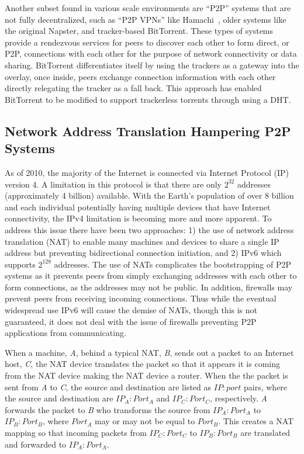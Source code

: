 \documentclass[conference]{IEEEtran}
\begin{document}
Another subset found in various scale environments are ``P2P'' systems that are
not fully decentralized, such as ``P2P VPNs'' like Hamachi~\cite{hamachi},
older systems like the original Napster, and tracker-based BitTorrent.  These
types of systems provide a rendezvous services for peers to discover each other
to form direct, or P2P, connections with each other for the purpose of network
connectivity or data sharing.  BitTorrent differentiates itself by using the
trackers as a gateway into the overlay, once inside, peers exchange connection
information with each other directly relegating the tracker as a fall back.
This approach has enabled BitTorrent to be modified to support trackerless
torrents through using a DHT.

\subsection{Network Address Translation Hampering P2P Systems}

As of 2010, the majority of the Internet is connected via Internet Protocol
(IP) version 4.  A limitation in this protocol is that there are only $2^{32}$
addresses (approximately 4 billion) available.  With the Earth's population of
over 8 billion and each individual potentially having multiple devices that
have Internet connectivity, the IPv4 limitation is becoming more and more
apparent.  To address this issue there have been two approaches:  1) the use of
network address translation (NAT) to enable many machines and devices to share
a single IP address but preventing bidirectional connection initiation, and 2)
IPv6 which supports $2^{128}$ addresses.  The use of NATs complicates the
bootstrapping of P2P systems as it prevents peers from simply exchanging
addresses with each other to form connections, as the addresses may not be
public.  In addition, firewalls may prevent peers from receiving incoming
connections.  Thus while the eventual widespread use IPv6 will cause the demise
of NATs, though this is not guaranteed, it does not deal with the issue of
firewalls preventing P2P applications from communicating.

When a machine, \textit{A}, behind a typical NAT, \textit{B}, sends out a
packet to an Internet host, \textit{C}, the NAT device translates the packet so
that it appears it is coming from the NAT device making the NAT device a router.
When the the packet is sent from \textit{A} to \textit{C}, the source and
destination are listed as $IP:port$ pairs, where the source and destination are
$IP_A:Port_A$ and $IP_C:Port_C$, respectively.  \textit{A} forwards the packet
to \textit{B} who transforms the source from $IP_A:Port_A$ to $IP_B:Port_B$,
where $Port_A$ may or may not be equal to $Port_B$.  This creates a NAT mapping
so that incoming packets from $IP_C:Port_C$ to $IP_B:Port_B$ are translated and
forwarded to $IP_A:Port_A$.
\end{document}
